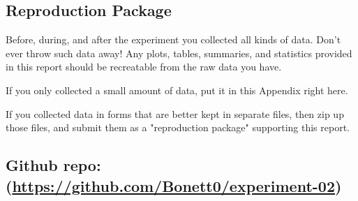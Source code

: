 \documentclass{article}
\begin{document}
\subsection{Reproduction Package}

Before, during, and after the experiment you collected all kinds of data. Don't ever throw such data away! Any plots, tables, summaries, and statistics provided in this report should be recreatable from the raw data you have.

If you only collected a small amount of data, put it in this Appendix right here.

If you collected data in forms that are better kept in separate files, then zip up those files, and submit them as a "reproduction package" supporting this report.


\subsection*{{Github repo: (\url{https://github.com/Bonett0/experiment-02})}}
\end{document}
